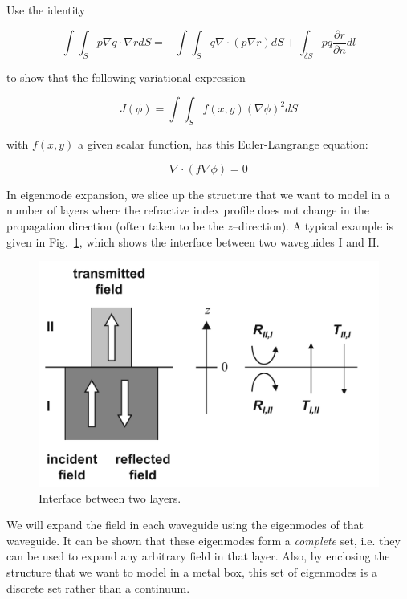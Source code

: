 \begin{exer}

Use the identity

$$\int \int_S p \nabla q \cdot \nabla r dS= - \int \int_S q \nabla \cdot (p \nabla r) dS + \int_{\delta S} pq \frac{\partial r}{\partial n} dl$$

to show that the following variational expression

$$J(\phi)=\int \int_S f(x,y) (\nabla \phi)^2 dS$$

with $f(x,y)$ a given scalar function, has this Euler-Langrange equation:

$$\nabla \cdot \left( f \nabla \phi \right) = 0 $$

\end{exer}



\pagebreak



In eigenmode expansion, we slice up the structure that we want to model in a number of layers where the refractive index profile does not change in the propagation direction (often taken to be the $z$--direction). A typical example is given in Fig.~\ref{fig-interface}, which shows the interface between two waveguides I and II.

\begin{figure}
\centering
\includegraphics{numeric/figures/interface}
\caption{Interface between two layers.}
\label{fig-interface}
\end{figure}

We will expand the field in each waveguide using the eigenmodes of that waveguide. It can be shown that these eigenmodes form a \emph{complete} set, i.e. they can be used to expand any arbitrary field in that layer. Also, by enclosing the structure that we want to model in a metal box, this set of eigenmodes is a discrete set rather than a continuum.

